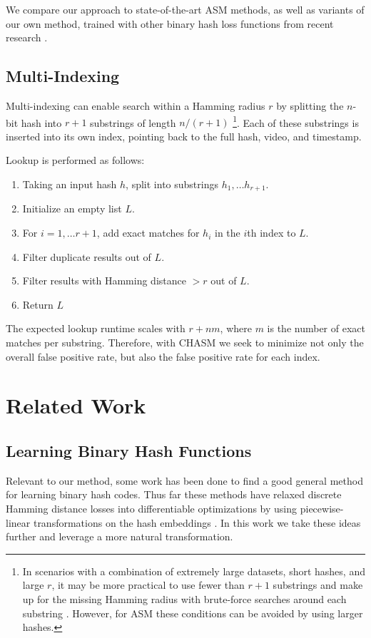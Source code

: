 \documentclass{article}
\begin{document}
\begin{multicols}{2}
We compare our approach to state-of-the-art ASM methods, as well as variants of our own method, trained with other binary hash loss functions from recent research \cite{supervised16, hashnet17}.


\subsection{Multi-Indexing}
\label{multi_index}

Multi-indexing can enable search within a Hamming radius $r$ by splitting the $n$-bit hash into $r+1$ substrings of length $n/(r+1)$ \cite{multi12}\footnote{
In scenarios with a combination of extremely large datasets, short hashes, and large $r$, it may be more practical to use fewer than $r+1$ substrings and make up for the missing Hamming radius with brute-force searches around each substring \cite{multi12}. However, for ASM these conditions can be avoided by using larger hashes.
}.
Each of these substrings is inserted into its own index, pointing back to the full hash, video, and timestamp.

Lookup is performed as follows:
\begin{enumerate}
\item Taking an input hash $h$, split into substrings $h_1, \ldots h_{r+1}$.
\item Initialize an empty list $L$.
\item For $i=1, \ldots r+1$, add exact matches for $h_i$ in the $i$th index to $L$.
\item Filter duplicate results out of $L$.
\item Filter results with Hamming distance $>r$ out of $L$.
\item Return $L$
\end{enumerate}
The expected lookup runtime scales with $r + nm$, where $m$ is the number of exact matches per substring.
Therefore, with CHASM we seek to minimize not only the overall false positive rate, but also the false positive rate for each index.


\section{Related Work}


\subsection{Learning Binary Hash Functions}

Relevant to our method, some work has been done to find a good general method for learning binary hash codes.
Thus far these methods have relaxed discrete Hamming distance losses into differentiable optimizations by using piecewise-linear transformations on the hash embeddings \cite{minimal11, metric12}.
In this work we take these ideas further and leverage a more natural transformation.



\end{multicols}
\end{document}
